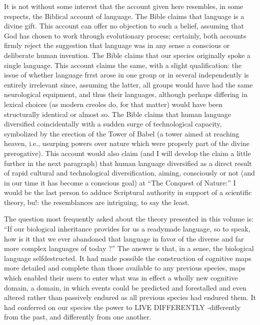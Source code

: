 It is not without some interest that the account given here resembles, in some respects, the Biblical account of language. The Bible claims that language is a divine gift. This account can offer no objection to such a belief, assuming that God has chosen to work through evolutionary process; certainly, both accounts firmly reject the suggestion that language was in any sense a conscious or deliberate human invention. The Bible claims that our species originally spoke a single language. This account claims the same, with a slight qualifi\-cation: the issue of whether language frrst arose in one group or in several independently is entirely irrelevant since, assuming the latter, all groups would have had the same neurological equipment, and thus their languages, although perhaps differing in lexical choices (as modern creoles do, for that matter) would have been structurally identical or almost so. The Bible claims that human language diversified coinci\-dentally with a sudden surge of technological capacity, symbolized
by the erection of the Tower of Babel (a tower aimed at reaching heaven, i.e., usurping powers over nature which were properly part of the divine prerogative). This account would also claim (and I will develop the claim a little further in the next paragraph) that human language diversified as a direct result of rapid cultural and technological diversification, aiming, consciously or not (and in our time it has become a conscious goal) at ``The Conquest of Nature:'' I would be the last person to adduce Scriptural authority in support of a scientific theory, bu!: the resemblances are intriguing, to say the least.

The question most frequently asked about the theory presented in this volume is: ``If our biological inheritance provides for us a ready\-made language, so to speak, how is it that we ever abandoned that language in favor of the diverse and far more complex languages of today ?'' The answer is that, in a sense, the biological language self\-destructed. It had made possible the construction of cognitive maps more detailed and complete than those available to any previous species, maps which enabled their users to enter what was in effect a wholly new cognitive domain, a domain, in which events could be predicted and forestalled and even altered rather than passively endured as all previous species had endured them. It had conferred on our species the power to LIVE DIFFERENTLY {}-differently from the past, and differently from one another.

